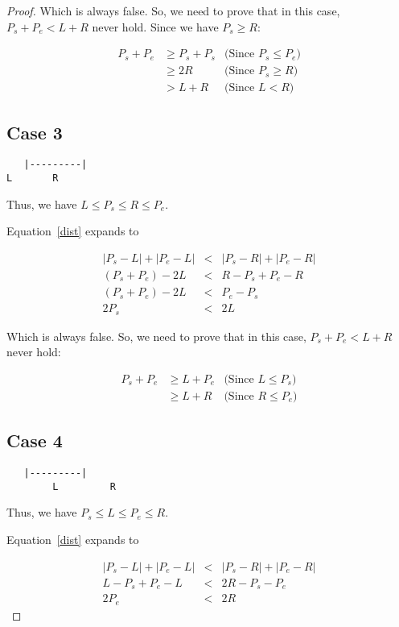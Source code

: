\documentclass[a4paper]{article}
\begin{document}
\begin{proof}
Which is always false. So, we need to prove that in this case,
$P_s + P_e < L+R$ never hold. Since we have $P_s \ge R$:

\begin{eqnarray*}
  P_s + P_e &\ge P_s + P_s & \text{(Since $P_s \le P_e$)} \\
            &\ge 2R & \text{(Since $P_s \ge R$)} \\
            &> L + R & \text{(Since $L < R$)}
\end{eqnarray*}

\subsection{Case 3}

\begin{verbatim}
   |---------|
L       R
\end{verbatim}

Thus, we have $L \le P_s \le R \le P_e$.

Equation~\ref{dist} expands to

\begin{eqnarray*}
  |P_s - L| + |P_e - L| &<& |P_s - R| + |P_e - R| \\
  (P_s + P_e) - 2L &<& R - P_s + P_e - R \\
  (P_s + P_e) - 2L &<& P_e - P_s \\
  2P_s &<& 2L
\end{eqnarray*}

Which is always false. So, we need to prove that in this case,
$P_s + P_e < L+R$ never hold:

\begin{eqnarray*}
  P_s + P_e &\ge L + P_e & \text{(Since $L \le P_s$)} \\
            &\ge L + R & \text{(Since $R \le P_e$)}
\end{eqnarray*}

\subsection{Case 4}

\begin{verbatim}
   |---------|
        L         R
\end{verbatim}

Thus, we have $P_s \le L \le P_e \le R$.

Equation~\ref{dist} expands to

\begin{eqnarray*}
  |P_s - L| + |P_e - L| &<& |P_s - R| + |P_e - R| \\
  L - P_s + P_e - L &<& 2R - P_s - P_e \\
  2P_e &<& 2R
\end{eqnarray*}


\end{proof}
\end{document}
